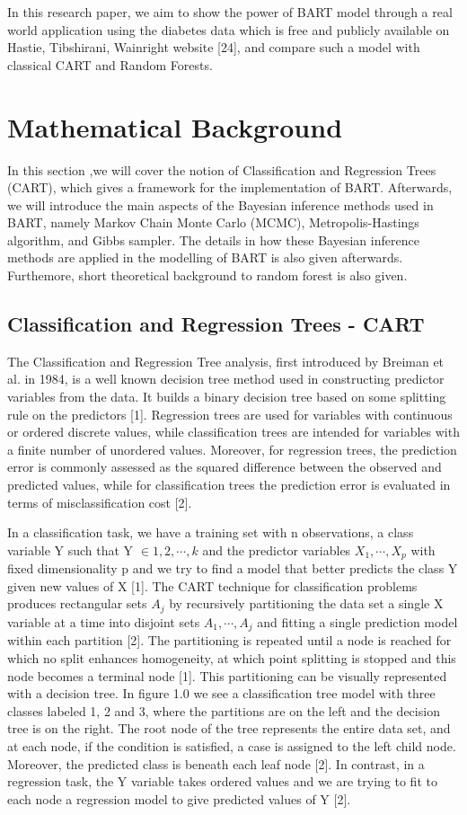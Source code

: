 \documentclass{usiinftr}
\begin{document}
In this research paper, we aim to show the power of BART model through a real world application using the diabetes data which is free and publicly available on Hastie, Tibshirani,
Wainright website [24], and compare such a model with classical CART and Random Forests.  

\section{Mathematical Background}
In this section ,we will cover the notion of Classification and Regression Trees (CART), which gives a framework for the implementation of BART. 
Afterwards, we will introduce the main aspects of the Bayesian inference methods used in BART, namely Markov Chain Monte Carlo (MCMC), Metropolis-Hastings algorithm, and Gibbs sampler. The details in how these Bayesian inference methods are applied in the modelling of BART is also given afterwards. Furthemore, short theoretical background to random forest is also given.

\subsection{Classification and Regression Trees - CART}
The Classification and Regression Tree analysis, first introduced by Breiman et al. in 1984, is a well known decision tree method used in constructing predictor variables from the data. It builds a binary decision tree based on some splitting rule on the predictors [1]. Regression trees are used for variables with continuous or ordered discrete values, while classification trees are intended for variables with a finite number of unordered values. Moreover, for regression trees, the prediction error is commonly assessed as the squared difference between the observed and predicted values, while for classification trees the prediction error is evaluated in terms of misclassification cost [2].

In a classification task, we have a training set with n observations, a class variable Y such that Y $\in {1, 2, \cdots, k}$ and the predictor variables $X_1, \cdots ,X_p$ with fixed dimensionality p and we try to find a model that better predicts the class Y given new values of X [1]. The CART technique for classification problems produces rectangular sets $A_j$ by recursively partitioning the data set a single X variable at a time into disjoint sets $A_1,\cdots, A_j$ and fitting a single prediction model within each partition [2]. The partitioning is repeated until a node is reached for which no split enhances homogeneity, at which point splitting is stopped and this node becomes a terminal node [1]. This partitioning can be visually represented with a decision tree. In figure 1.0 we see a classification tree model with three classes labeled 1, 2 and 3, where the partitions are on the left and the decision tree is on the right. The root node of the tree represents the entire data set, and at each node, if the condition is satisfied, a case is assigned to the left child node. Moreover, the predicted class is beneath each leaf node [2]. In contrast, in a regression task, the Y variable takes ordered values and we are trying to fit to each node a regression model to give predicted values of Y [2].
\end{document}
